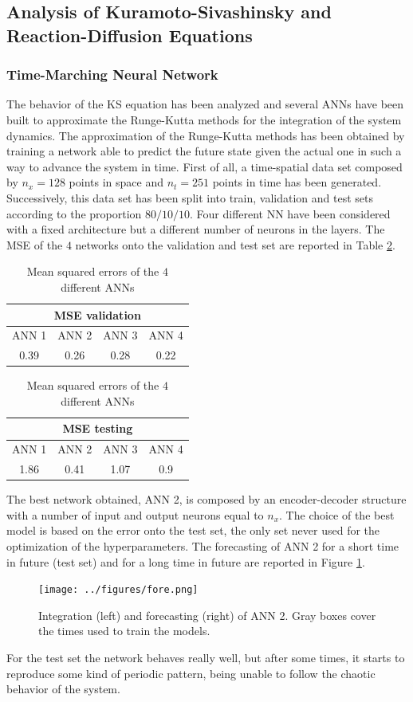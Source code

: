\documentclass[]{article}
\begin{document}
\subsection{Analysis of Kuramoto-Sivashinsky and Reaction-Diffusion Equations}
\subsubsection{Time-Marching Neural Network}
The behavior of the KS equation has been analyzed and several ANNs have been built to approximate the Runge-Kutta methods for the integration of the system dynamics. The approximation of the Runge-Kutta methods has been obtained by training a network able to predict the future state given the actual one in such a way to advance the system in time. First of all, a time-spatial data set composed by $n_x=128$ points in space and $n_t=251$ points in time has been generated. Successively, this data set has been split into train, validation and test sets according to the proportion $ 80/10/10$. Four different NN have been considered with a fixed architecture but a different number of neurons in the layers. The MSE of the $4$ networks onto the validation and test set are reported in Table \ref{table:1}.
\begin{table}[!b]
	\begin{centering}
	\begin{tabular}{cccc}
		\hline \hline
		\multicolumn{4}{c}{MSE validation}       \\ \hline \hline
		ANN 1 & ANN 2 & ANN 3 & ANN 4 \\ \hline
		0.39  & 0.26  & 0.28  & 0.22  \\ \hline
	\end{tabular}
\quad 
\begin{tabular}{cccc}
	\hline \hline
	\multicolumn{4}{c}{MSE testing}       \\ \hline \hline
	ANN 1 & ANN 2 & ANN 3 & ANN 4 \\ \hline
	1.86  & 0.41  & 1.07  & 0.9  \\ \hline
\end{tabular}
\caption{Mean squared errors of the $4$ different ANNs}
\label{table:1}
\end{centering}
\end{table}
The best network obtained, ANN 2, is composed by an encoder-decoder structure with a number of input and output neurons equal to $n_x$. The choice of the best model is based on the error onto the test set, the only set never used for the optimization of the hyperparameters. The forecasting of ANN 2 for a short time in future (test set) and for a long time in future are reported in Figure \ref{fig:fig8}.
\begin{figure}[!b]
	\centering
	\texttt{[image: ../figures/fore.png]}
	\caption{Integration (left) and forecasting (right) of ANN 2. Gray boxes cover the times used to train the models.}
	\label{fig:fig8}
\end{figure}
For the test set the network behaves really well, but after some times, it starts to reproduce some kind of periodic pattern, being unable to follow the chaotic behavior of the system.
\end{document}
